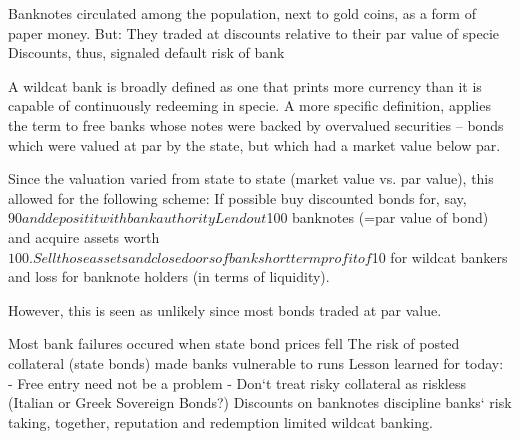 Banknotes circulated among the population, next to gold coins,
as a form of paper money. But:
They traded at discounts relative to their par value of specie
Discounts, thus, signaled default risk of bank


A wildcat bank is broadly defined as one that prints more currency than it is capable of continuously redeeming in specie. 
A more specific definition, applies the term to free banks whose notes were backed by overvalued securities – 
bonds which were valued at par by the state, but which had a market value below par.

Since the valuation varied from state to state (market value vs. par value), this allowed for the following scheme:
If possible buy discounted bonds for, say, $90 and deposit it with bank authority
Lend out $100 banknotes (=par value of bond) and acquire assets worth $100. 
Sell those assets and close doors of bank 
short term profit of $10 for wildcat bankers and loss for banknote holders (in terms of liquidity).

However, this is seen as unlikely since most bonds traded at par value.

Most bank failures occured when state bond prices fell
The risk of posted collateral (state bonds) made banks
vulnerable to runs
Lesson learned for today:
- Free entry need not be a problem
- Don‘t treat risky collateral as riskless (Italian or Greek Sovereign Bonds?)
Discounts on banknotes discipline banks‘ risk taking, together, reputation and redemption limited wildcat banking.
